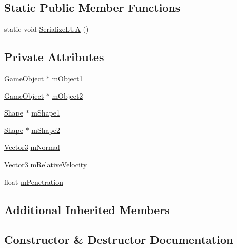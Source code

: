 \subsection*{Static Public Member Functions}
\begin{DoxyCompactItemize}
\item 
static void \hyperlink{classCollisionMessage_a788f95d84bbd1cd56100b98ec452a9a8}{Serialize\+L\+UA} ()
\end{DoxyCompactItemize}
\subsection*{Private Attributes}
\begin{DoxyCompactItemize}
\item 
\hyperlink{classGameObject}{Game\+Object} $\ast$ \hyperlink{classCollisionMessage_af022490e09dc84e9a03291d23f97c6c0}{m\+Object1}
\item 
\hyperlink{classGameObject}{Game\+Object} $\ast$ \hyperlink{classCollisionMessage_a86e0b0e8033d5826979af9a44006500f}{m\+Object2}
\item 
\hyperlink{structShape}{Shape} $\ast$ \hyperlink{classCollisionMessage_ab5cd196f62b1e8931e02190f1548965a}{m\+Shape1}
\item 
\hyperlink{structShape}{Shape} $\ast$ \hyperlink{classCollisionMessage_add423f7b16d07fe364a5bb0198276264}{m\+Shape2}
\item 
\hyperlink{structVector3}{Vector3} \hyperlink{classCollisionMessage_ab4c66faa8cba67ac834c9a17aa8cbf37}{m\+Normal}
\item 
\hyperlink{structVector3}{Vector3} \hyperlink{classCollisionMessage_a382a90fbeb1efa6b78c040b6f6eead27}{m\+Relative\+Velocity}
\item 
float \hyperlink{classCollisionMessage_a20771768b31377e76a3f05594abf5593}{m\+Penetration}
\end{DoxyCompactItemize}
\subsection*{Additional Inherited Members}


\subsection{Constructor \& Destructor Documentation}
